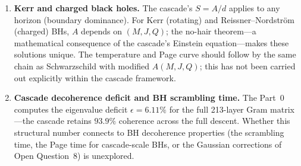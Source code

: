 \documentclass[12pt,a4paper]{article}
\begin{document}
\begin{enumerate}
\begin{itemize}
$S_{\rm rad}=\min(\cdot,\cdot)$ is exact for Haar-random states; the
cascade's entanglement is Gaussian. For $S_{\rm BH}\gg 1$ the two
agree to high accuracy, but cascade-specific corrections near the
Page time should be computable from the Gaussian eigenvalue structure.
\item \emph{Remnant question.} Whether the cascade's finite
213-layer tower permits complete evaporation ($A\to 0$) or forces a
Planck-scale remnant is not established; the remnant endpoint
modifies step~(10).
\item \emph{Backreaction.} The quasi-static evaporation of steps
(5)--(6) assumes flat-space radiation; cosmological-scale BHs need
FRW curvature corrections.
\end{itemize}
\item\label{oq:kerr-rn} \textbf{Kerr and charged black holes.} The
cascade's $S = A/d$ applies to any horizon (boundary dominance). For
Kerr (rotating) and Reissner--Nordstr\"{o}m (charged) BHs, $A$ depends
on $(M,J,Q)$; the no-hair theorem---a mathematical consequence of the
cascade's Einstein equation---makes these solutions unique. The
temperature and Page curve should follow by the same chain as
Schwarzschild with modified $A(M,J,Q)$; this has not been carried out
explicitly within the cascade framework.
\item\label{oq:decoherence-scrambling} \textbf{Cascade decoherence
deficit and BH scrambling time.} The Part~0 computes the
eigenvalue deficit $\epsilon = 6.11\%$ for the full 213-layer Gram
matrix---the cascade retains $93.9\%$ coherence across the full
descent. Whether this structural number connects to BH decoherence
properties (the scrambling time, the Page time for cascade-scale BHs,
or the Gaussian corrections of Open Question~8) is unexplored.
\end{enumerate}
\end{document}
